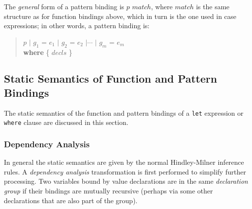 The \emph{general} form of a pattern binding is $p$ $match$, where $match$ is the same structure as for function bindings above, which in turn is the one used in case expressions; in other words, a pattern binding is:
\begin{quote}
\begin{flushleft}
$p$ $|$ $g_1$ = $e_1$ $|$ $g_2$ = $e_2$ $|\cdots$ $|$ $g_m$ = $e_m$\\
\hspace{0.3cm}\textbf{where} \{ $decls$ \}
\end{flushleft}
\end{quote}

\subsection{Static Semantics of Function and Pattern Bindings} \label{letsemantics}

The static semantics of the function and pattern bindings of a \texttt{let} expression or \texttt{where} clause are discussed in this section.

\subsubsection{Dependency Analysis} \label{declgroup}

In general the static semantics are given by the normal Hindley-Milner inference rules.
A \emph{dependency analysis} transformation is first performed to simplify further processing.
Two variables bound by value declarations are in the same \emph{declaration group} if their bindings are mutually recursive (perhaps via some other declarations that are also part of the group).

